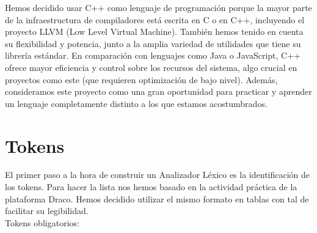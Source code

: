 \documentclass{article}
\begin{document}
Hemos decidido usar C++ como lenguaje de programación porque la mayor parte de la infraestructura de compiladores está escrita en C o en C++, incluyendo el proyecto LLVM (Low Level Virtual Machine). También hemos tenido en cuenta su flexibilidad y potencia, junto a la amplia variedad de utilidades que tiene su librería estándar. En comparación con lenguajes como Java o JavaScript, C++ ofrece mayor eficiencia y control sobre los recursos del sistema, algo crucial en proyectos como este (que requieren optimización de bajo nivel). Además, consideramos este proyecto como una gran oportunidad para practicar y aprender un lenguaje completamente distinto a los que estamos acostumbrados.

\newpage

\section{Tokens}
El primer paso a la hora de construir un Analizador Léxico es la identificación de los tokens. Para hacer la lista nos hemos basado en la actividad práctica de la plataforma Draco. Hemos decidido utilizar el mismo formato en tablas con tal de facilitar su legibilidad.\\
Tokens obligatorios:
\end{document}
